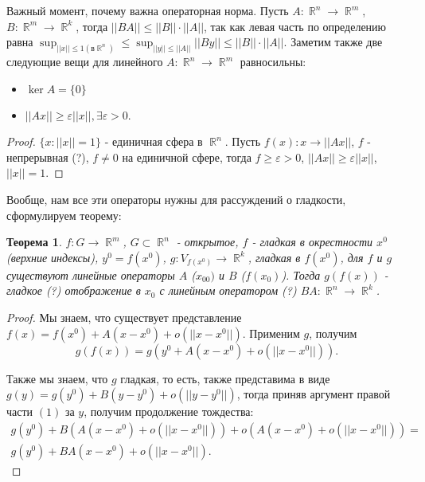 \documentclass[a4paper,100pt]{article}
\theoremstyle{indented}
\newtheorem{theorem}{Теорема}
\theoremstyle{definition}
\theoremstyle{remark}
\DeclareMathOperator{\RR}{\mathbb{R}}
\begin{document}
Важный момент, почему важна операторная норма. Пусть $A:\RR^n\rightarrow \RR^m$, $B:\RR^m\rightarrow \RR^k$, тогда $||BA||\leq ||B||\cdot||A||$, так как левая часть по определению равна $\sup_{||x||\leq 1 (в \RR^n)}\leq \sup_{||y||\leq||A||}||By||\leq ||B||\cdot||A||$. Заметим также две следующие вещи для линейного $A:\RR^n\rightarrow \RR^m$ равносильны: \ 

\begin{itemize}
    \item $\ker A=\{0\}$
    \item $||Ax||\geq \varepsilon ||x||, \exists \varepsilon >0$. 
\end{itemize}

\begin{proof}
    $\{x:||x||=1\}$ - единичная сфера в $\RR^n$. Пусть $f(x):x\rightarrow ||Ax||$, $f$ - непрерывная (?), $f\neq 0$ на единичной сфере, тогда $f\geq \varepsilon >0$, $||Ax||\geq \varepsilon||x||$, $||x||=1$. 
\end{proof}

Вообще, нам все эти операторы нужны для рассуждений о гладкости, сформулируем теорему: \\ 

\begin{theorem}
    $f: G\rightarrow \RR^m$, $G\subset \RR^n$ - открытое, $f$ - гладкая в окрестности $x^0$ (верхние индексы), $y^0=f(x^0)$, $g:V_{f(x^0)}\rightarrow \RR^k$, гладкая в $f(x^0)$, для $f$ и $g$ существуют линейные операторы $A$ ($x_00)$ и $B$ ($f(x_0)$). Тогда $g(f(x))$ - гладкое (?) отображение в $x_0$ с линейным оператором (?) $BA:\RR^n\rightarrow \RR^k$. 
\end{theorem}

\begin{proof}
    Мы знаем, что существует представление $f(x)=f(x^0)+A(x-x^0)+o(||x-x^0||)$. Применим $g$, получим 
    \begin{equation}
        g(f(x))=g(y^0+A(x-x^0)+o(||x-x^0||)).
    \end{equation}
        
    Также мы знаем, что $g$ гладкая, то есть, также представима в виде $g(y)=g(y^0)+B(y-y^0)+o(||y-y^0||)$, тогда приняв аргумент правой части $(1)$ за $y$, получим продолжение тождества: 
    \begin{equation}
        \begin{split}
            g(y^0)+B(A(x-x^0)+o(||x-x^0||))+o(A(x-x^0)+o(||x-x^0||)) = \\ 
            g(y^0)+BA(x-x^0)+o(||x-x^0||).
        \end{split}
\end{equation}
\end{proof}
\end{document}
